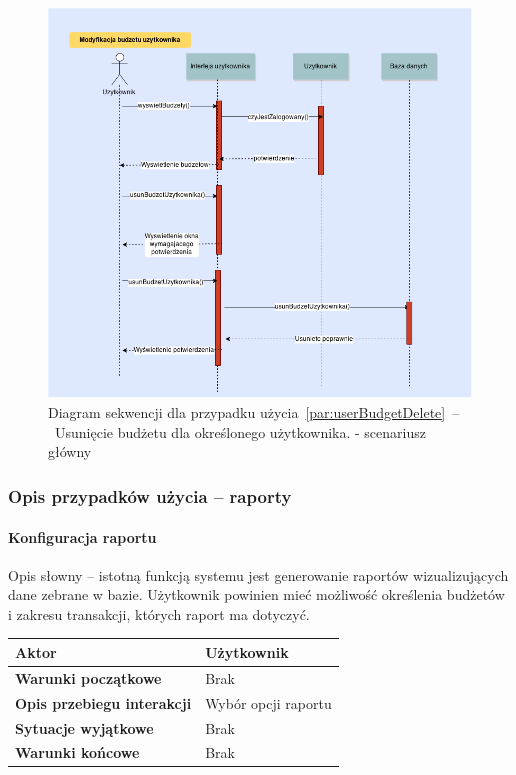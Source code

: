 \begin{figure}[H]
    \includegraphics[width=\textwidth,
    height=0.5\textheight]{images/usun_budzet_uzytkownika.png}
    \caption{Diagram sekwencji dla przypadku użycia~\ref{par:userBudgetDelete}~--~Usunięcie budżetu dla określonego użytkownika.
    - scenariusz główny}
\end{figure}

\subsubsection{Opis przypadków użycia -- raporty}

\paragraph{Konfiguracja raportu\newline}
\label{par:reportConfig}
Opis słowny -- istotną funkcją systemu jest generowanie raportów wizualizujących dane zebrane w bazie. Użytkownik powinien mieć możliwość określenia budżetów i zakresu transakcji, których raport ma dotyczyć.

\begin{longtable}{|p{5cm}|p{7cm}|}
 	\hline
	\textbf{Aktor} & Użytkownik \\
	\hline
	\textbf{Warunki początkowe} & Brak \\
	\hline
	\textbf{Opis przebiegu interakcji} & Wybór opcji raportu \\
	\hline
	\textbf{Sytuacje wyjątkowe} & Brak \\
	\hline
	\textbf{Warunki końcowe} & Brak \\
	\hline
\end{longtable}

